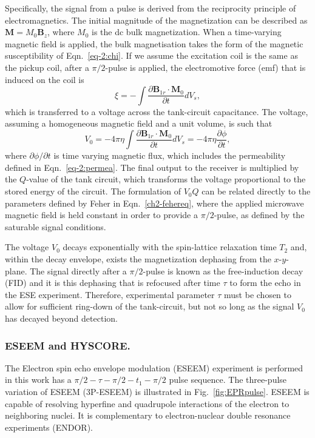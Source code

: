 Specifically, the signal from a pulse is derived from the reciprocity principle of electromagnetics. \cite{HOULT2011329} The initial magnitude of the magnetization can be described as $\mathbf{M} = M_0 \mathbf{B}_z$, where $M_0$ is the dc bulk magnetization. When a time-varying magnetic field is applied, the bulk magnetisation takes the form of the magnetic susceptibility of Eqn.~\ref{eq-2:chi}. If we assume the excitation coil is the same as the pickup coil, after a $\pi/2$-pulse is applied, the electromotive force (emf) that is induced on the coil is 
\begin{equation}
    \xi = - \int \frac{\partial \mathbf{B}_{1r} \cdot \mathbf{M}_0}{\partial t} dV_s,
\end{equation}
which is transferred to a voltage across the tank-circuit capacitance. The voltage, assuming a homogeneous magnetic field and a unit volume, is such that
\begin{equation}
    V_0 = - 4\pi \eta \int \frac{\partial \mathbf{B}_{1r} \cdot \mathbf{M}_0}{\partial t} dV_s = - 4 \pi \eta \frac{\partial \phi}{\partial t},
\end{equation}
where $\partial \phi/\partial t$ is time varying magnetic flux, which includes the permeability defined in Eqn.~\ref{eq-2:permea}. \cite{schumacher1970introduction,slichter1978principles,HOULT2011329} The final output to the receiver is multiplied by the $Q$-value of the tank circuit, which transforms the voltage proportional to the stored energy of the circuit. \cite{ramo1984fields} The formulation of $V_0 Q$ can be related directly to the parameters defined by Feher in Eqn.~\ref{ch2-fehereq}, where the applied microwave magnetic field is held constant in order to provide a $\pi/2$-pulse, as defined by the saturable signal conditions.

The voltage $V_0$ decays exponentially with the spin-lattice relaxation time $T_2$ and, within the decay envelope, exists the magnetization dephasing from the $x$-$y$-plane. The signal directly after a $\pi/2$-pulse is known as the free-induction decay (FID) and it is this dephasing that is refocused after time $\tau$ to form the echo in the ESE experiment. Therefore, experimental parameter $\tau$ must be chosen to allow for sufficient ring-down of the tank-circuit, but not so long as the signal $V_0$ has decayed beyond detection.

\subsubsection*{ESEEM and HYSCORE.}
The Electron spin echo envelope modulation (ESEEM) experiment is performed in this work has a ${\pi/2\!-\!\tau\!-\!\pi/2\!-\!t_1\!-\!\pi/2}$ pulse sequence. The three-pulse variation of ESEEM (3P-ESEEM) is illustrated in Fig.~\ref{fig:EPRpulse}. ESEEM is capable of resolving hyperfine and quadrupole interactions of the electron to neighboring nuclei. It is complementary to electron-nuclear double resonance experiments (ENDOR). \cite{schweiger2001principles,Doorslaer2007,Harmer2009,CUTSAIL20151370}

